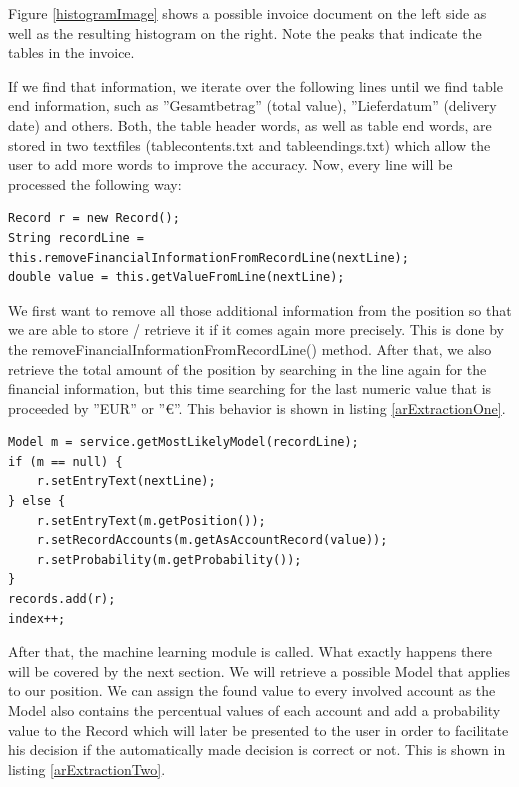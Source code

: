 Figure \ref{histogramImage} shows a possible invoice document on the left side as well as the resulting histogram on the right. Note the peaks that indicate the tables in the invoice.

If we find that information, we iterate over the following lines until we find table end information, such as ''Gesamtbetrag'' (total value), ''Lieferdatum'' (delivery date) and others. Both, the table header words, as well as table end words, are stored in two textfiles (tablecontents.txt and tableendings.txt) which allow the user to add more words to improve the accuracy.
Now, every line will be processed the following way:

\begin{lstlisting}[caption={Manipulating and retrieving information from a position},label={arExtractionOne}]
Record r = new Record();
String recordLine = this.removeFinancialInformationFromRecordLine(nextLine);
double value = this.getValueFromLine(nextLine);
\end{lstlisting}

We first want to remove all those additional information from the position so that we are able to store / retrieve it if it comes again more precisely. This is done by the removeFinancialInformationFromRecordLine() method. 
After that, we also retrieve the total amount of the position by searching in the line again for the financial information, but this time searching for the last numeric value that is proceeded by ''EUR'' or ''\euro''. This behavior is shown in listing \ref{arExtractionOne}.

\begin{lstlisting}[caption={Finding a model for the position},label={arExtractionTwo}]
Model m = service.getMostLikelyModel(recordLine); 
if (m == null) {
    r.setEntryText(nextLine);
} else {
    r.setEntryText(m.getPosition());
    r.setRecordAccounts(m.getAsAccountRecord(value));
    r.setProbability(m.getProbability());
}
records.add(r);
index++;
\end{lstlisting}

After that, the machine learning module is called. What exactly happens there will be covered by the next section. We will retrieve a possible Model that applies to our position. We can assign the found value to every involved account as the Model also contains the percentual values of each account and add a probability value to the Record which will later be presented to the user in order to facilitate his decision if the automatically made decision is correct or not. This is shown in listing \ref{arExtractionTwo}.


